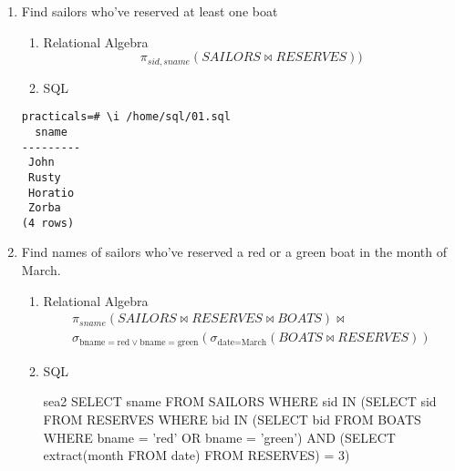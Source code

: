 \begin{enumerate}
      \item  Find sailors who've reserved at least one boat
            \begin{enumerate}
                  \item Relational Algebra
                        \begin{equation*}
                              \pi_{sid, sname}(SAILORS \bowtie RESERVES))
                        \end{equation*}

                  \item  SQL \linebreak {}
            \end{enumerate}

            \begin{lstlisting}[style=output]
practicals=# \i /home/sql/01.sql 
  sname  
---------
 John
 Rusty
 Horatio
 Zorba
(4 rows)
            \end{lstlisting}
            \vspace{1cm}

      \item Find names of sailors who've reserved a red or a green boat in the month of March.
            \begin{enumerate}
                  \item Relational Algebra
                        \begin{multline*}
                              \pi_{sname}(SAILORS \bowtie RESERVES \bowtie BOATS) \bowtie \\
                              \sigma_{\text{bname} = \text{red} \lor \text{bname} = \text{green}}(\sigma_{\text{date} = \text{March}}(BOATS \bowtie RESERVES))
                        \end{multline*}

                  \item  SQL
                        \begin{sqlQuery}{sea2}
                            SELECT sname
                            FROM SAILORS
                            WHERE sid IN
                                (SELECT sid
                                FROM RESERVES
                                WHERE bid IN
                                    (SELECT bid
                                    FROM BOATS
                                    WHERE bname = 'red' OR bname = 'green')
                                AND (SELECT extract(month FROM date) FROM RESERVES) = 3)
                    \end{sqlQuery}


\end{enumerate}
\end{enumerate}
